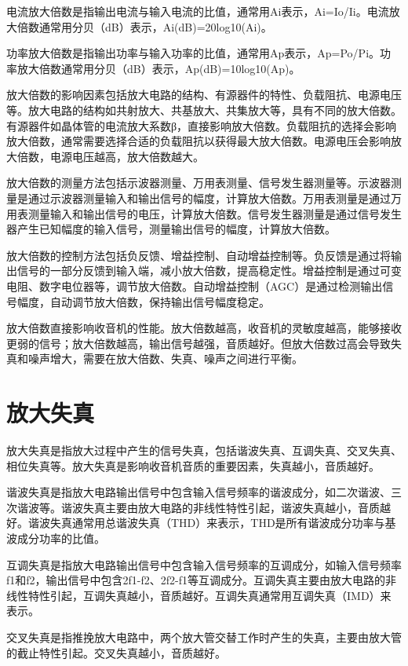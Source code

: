 \documentclass[12pt,UTF8]{ctexbook}
\begin{document}
电流放大倍数是指输出电流与输入电流的比值，通常用Ai表示，Ai=Io/Ii。电流放大倍数通常用分贝（dB）表示，Ai(dB)=20log10(Ai)。

功率放大倍数是指输出功率与输入功率的比值，通常用Ap表示，Ap=Po/Pi。功率放大倍数通常用分贝（dB）表示，Ap(dB)=10log10(Ap)。

放大倍数的影响因素包括放大电路的结构、有源器件的特性、负载阻抗、电源电压等。放大电路的结构如共射放大、共基放大、共集放大等，具有不同的放大倍数。有源器件如晶体管的电流放大系数β，直接影响放大倍数。负载阻抗的选择会影响放大倍数，通常需要选择合适的负载阻抗以获得最大放大倍数。电源电压会影响放大倍数，电源电压越高，放大倍数越大。

放大倍数的测量方法包括示波器测量、万用表测量、信号发生器测量等。示波器测量是通过示波器测量输入和输出信号的幅度，计算放大倍数。万用表测量是通过万用表测量输入和输出信号的电压，计算放大倍数。信号发生器测量是通过信号发生器产生已知幅度的输入信号，测量输出信号的幅度，计算放大倍数。

放大倍数的控制方法包括负反馈、增益控制、自动增益控制等。负反馈是通过将输出信号的一部分反馈到输入端，减小放大倍数，提高稳定性。增益控制是通过可变电阻、数字电位器等，调节放大倍数。自动增益控制（AGC）是通过检测输出信号幅度，自动调节放大倍数，保持输出信号幅度稳定。

放大倍数直接影响收音机的性能。放大倍数越高，收音机的灵敏度越高，能够接收更弱的信号；放大倍数越高，输出信号越强，音质越好。但放大倍数过高会导致失真和噪声增大，需要在放大倍数、失真、噪声之间进行平衡。

\section{放大失真}

放大失真是指放大过程中产生的信号失真，包括谐波失真、互调失真、交叉失真、相位失真等。放大失真是影响收音机音质的重要因素，失真越小，音质越好。

谐波失真是指放大电路输出信号中包含输入信号频率的谐波成分，如二次谐波、三次谐波等。谐波失真主要由放大电路的非线性特性引起，谐波失真越小，音质越好。谐波失真通常用总谐波失真（THD）来表示，THD是所有谐波成分功率与基波成分功率的比值。

互调失真是指放大电路输出信号中包含输入信号频率的互调成分，如输入信号频率f1和f2，输出信号中包含2f1-f2、2f2-f1等互调成分。互调失真主要由放大电路的非线性特性引起，互调失真越小，音质越好。互调失真通常用互调失真（IMD）来表示。

交叉失真是指推挽放大电路中，两个放大管交替工作时产生的失真，主要由放大管的截止特性引起。交叉失真越小，音质越好。
\end{document}
